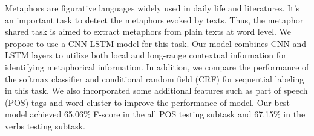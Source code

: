 Metaphors are figurative languages widely used in daily life and literatures. It's an important task to detect the metaphors evoked by texts. Thus, the metaphor shared task is aimed to extract metaphors from plain texts at word level. We propose to use a CNN-LSTM model for this task. Our model combines CNN and LSTM layers to utilize both local and long-range contextual information for identifying metaphorical information. In addition, we compare the performance of the softmax classifier and conditional random field (CRF) for sequential labeling in this task. We also incorporated some additional features such as part of speech (POS) tags and word cluster to improve the performance of model. Our best model achieved 65.06\% F-score in the all POS testing subtask and 67.15\% in the verbs testing subtask.
